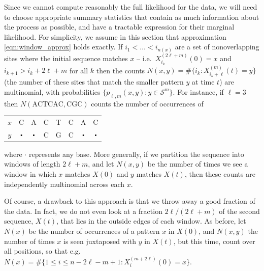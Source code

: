 \documentclass{article}
\newcommand{\calS}{\mathcal{S}}  %
\newcommand{\st}{\colon}  %
\theoremstyle{plain}
\theoremstyle{definition}
\begin{document}
Since we cannot compute reasonably the full likelihood for the data,
we will need to choose appropriate summary statistics
that contain as much information about the process as possible,
and have a tractable expression for their marginal likelihood.
For simplicity,
we assume in this section that approximation \eqref{eqn:window_approx} holds exactly.
If $i_1 < \ldots < i_{n(x)}$ are a set of nonoverlapping sites where the initial sequence matches $x$
-- i.e.\ $X_{i_k}^{(2\ell+m)}(0)=x$ and $i_{k+1} > i_k + 2\ell+m$ for all $k$ %
then the counts $N(x,y)=\#\{ i_k \st X_{i_k+\ell}^{(m)}(t)=y\}$ (the number of these sites that match the smaller pattern $y$ at time $t$)
are multinomial, with probabilities $\{p_{\ell,m}(x,y)\st y \in \calS^m\}$.
For instance, if $\ell=3$ then $N(\text{ACTCAC}, \text{CGC})$ counts the number of occurrences of
\begin{center}
\begin{tabular}{c|ccccccc}
 $x$ &  C  & A & C & T & C & A & C \\
 $y$ &  $\centerdot$  & $\centerdot$  & C & G & C & $\centerdot$  & $\centerdot$
\end{tabular}
\end{center}
where $\cdot$ represents any base.
More generally, if we partition the sequence into windows of length $2\ell+m$,
and let $N(x,y)$ be the number of times we see a window in which $x$ matches $X(0)$ and $y$ matches $X(t)$,
then these counts are independently multinomial across each $x$.

Of course, a drawback to this approach is that we throw away a good fraction of the data.
In fact, we do not even look at a fraction $2\ell/(2\ell+m)$ of the second sequence, $X(t)$,
that lies in the outside edges of each window.
As before, let $N(x)$ be the number of occurrences of a pattern $x$ in $X(0)$,
and $N(x,y)$ the number of times $x$ is seen juxtaposed with $y$ in $X(t)$,
but this time, count over all positions,
so that e.g.\ $N(x) = \#\{ 1 \le i \le n - 2\ell - m + 1 \st X_i^{(m+2\ell)}(0)=x\}$.
\end{document}
